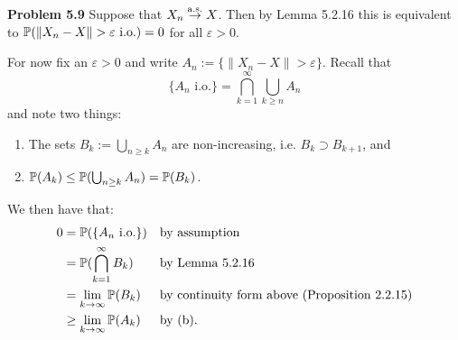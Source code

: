 \bigskip
\textbf{Problem 5.9}
Suppose that $X_n \stackrel{\mathrm{a.s.}}{\rightarrow} X$. Then by Lemma 5.2.16 this is equivalent to $\mathbb P(\|X_n - X\| > \varepsilon \text{ i.o.}) = 0$ for all $\varepsilon > 0$. 

For now fix an $\varepsilon > 0$ and write $A_n := \{\|X_n - X\| > \varepsilon\}$. Recall that
\[
	\{A_n \text{ i.o.}\} = \bigcap_{k = 1}^\infty \bigcup_{k \ge n} A_n
\]
and note two things:
\begin{enumerate}[label={(\alph*)}]
\item The sets $B_k := \bigcup_{n \ge k} A_n$ are non-increasing, i.e. $B_k \supset B_{k+1}$, and
\item $\mathbb P(A_k) \le \mathbb P(\bigcup_{n \ge k} A_n) = \mathbb P(B_k)$.
\end{enumerate}
 
We then have that:
\begin{align*}
	0 &= \mathbb P(\{A_n \text{ i.o.}\}) &&\text{by assumption} \\
	&= \mathbb P(\bigcap_{k =1}^\infty B_k) &&\text{by Lemma 5.2.16}\\
	&= \lim_{k \to \infty} \mathbb P(B_k) &&\text{by continuity form above (Proposition 2.2.15)}\\
	&\ge \lim_{k \to \infty} \mathbb P(A_k) &&\text{by (b)}.
\end{align*}



